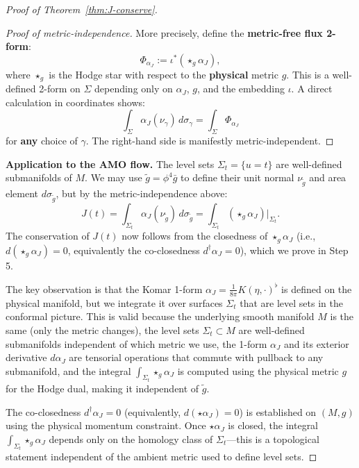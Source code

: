 \documentclass[12pt]{article}
\theoremstyle{plain}
\theoremstyle{definition}
\theoremstyle{remark}
\newcommand{\tg}{\tilde{g}}
\newcommand{\bg}{\bar{g}}
\begin{document}
\begin{proof}[Proof of Theorem~\ref{thm:J-conserve}]
\begin{proof}[Proof of metric-independence]
More precisely, define the \textbf{metric-free flux 2-form}:
\[
\Phi_{\alpha_J} := \iota^*(\star_g \alpha_J),
\]
where $\star_g$ is the Hodge star with respect to the \textbf{physical} metric $g$. This is a well-defined 2-form on $\Sigma$ depending only on $\alpha_J$, $g$, and the embedding $\iota$. A direct calculation in coordinates shows:
\[
\int_\Sigma \alpha_J(\nu_\gamma) \, d\sigma_\gamma = \int_\Sigma \Phi_{\alpha_J}
\]
for \textbf{any} choice of $\gamma$. The right-hand side is manifestly metric-independent.
\end{proof}

\textbf{Application to the AMO flow.} The level sets $\Sigma_t = \{u = t\}$ are well-defined submanifolds of $M$. We may use $\tg = \phi^4 \bg$ to define their unit normal $\nu_{\tg}$ and area element $d\sigma_{\tg}$, but by the metric-independence above:
\[
J(t) = \int_{\Sigma_t} \alpha_J(\nu_{\tg}) \, d\sigma_{\tg} = \int_{\Sigma_t} (\star_g \alpha_J)|_{\Sigma_t}.
\]
The conservation of $J(t)$ now follows from the closedness of $\star_g \alpha_J$ (i.e., $d(\star_g\alpha_J) = 0$, equivalently the co-closedness $d^\dagger\alpha_J = 0$), which we prove in Step 5.

The key observation is that the Komar 1-form $\alpha_J = \frac{1}{8\pi} K(\eta, \cdot)^\flat$ is defined on the physical manifold, but we integrate it over surfaces $\Sigma_t$ that are level sets in the conformal picture. This is valid because the underlying smooth manifold $M$ is the same (only the metric changes), the level sets $\Sigma_t \subset M$ are well-defined submanifolds independent of which metric we use, the 1-form $\alpha_J$ and its exterior derivative $d\alpha_J$ are tensorial operations that commute with pullback to any submanifold, and the integral $\int_{\Sigma_t} \star_g \alpha_J$ is computed using the physical metric $g$ for the Hodge dual, making it independent of $\tg$.

The co-closedness $d^\dagger\alpha_J = 0$ (equivalently, $d(\star\alpha_J) = 0$) is established on $(M, g)$ using the physical momentum constraint. Once $\star\alpha_J$ is closed, the integral $\int_{\Sigma_t} \star_g \alpha_J$ depends only on the homology class of $\Sigma_t$---this is a topological statement independent of the ambient metric used to define level sets.


\end{proof}
\end{document}
